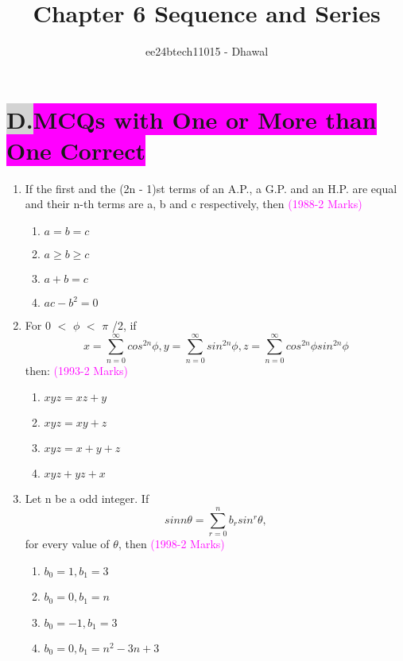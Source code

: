 \documentclass[journal,12pt,twocolumn]{IEEEtran}
\theoremstyle{remark}
\begin{document}

\vspace{3cm}

\title{Chapter 6 Sequence and Series}
\author{ee24btech11015 - Dhawal}
\maketitle
\newpage
\bigskip

\renewcommand{\thefigure}{\theenumi}
\renewcommand{\thetable}{\theenumi}

\section*{\colorbox{lightgray}{D.}\colorbox{magenta}{MCQs with One or More than One Correct}}
\begin{enumerate}
    \item If the first and the (2n - 1)st terms of an A.P., a G.P. and an H.P. are equal and their n-th terms are a, b and c respectively, then  
    \textcolor{magenta}{(1988-2 Marks)}
\begin{multicols}{2}
\begin{enumerate}
\item $a=b=c$
\item $a \geq b \geq c$
\item $a+b=c$
\item $ac-b^2=0$
\end{enumerate}
\end{multicols}

\item For 0 $<$ $\phi$ $<$ $\pi$ /2, if 
\begin{equation*}
x=\sum_{n=0}^{\infty} cos^{2n} \phi ,
y=\sum_{n=0}^{\infty} sin^{2n} \phi ,
z=\sum_{n=0}^{\infty} cos^{2n} \phi sin^{2n} \phi
\end{equation*}
then: \hfill\textcolor{magenta}{(1993-2 Marks)}
\begin{multicols}{2}
\begin{enumerate}
\item $xyz=xz+y$
\item $xyz=xy+z$
\item $xyz=x+y+z$
\item $xyz+yz+x$
\end{enumerate}
\end{multicols}

\item Let n be a odd integer. If 
\begin{equation*}
sin n\theta= \sum_{r=0}^{n} b_r sin^{r} \theta, 
\end{equation*}
for every value of $\theta$, then
\hfill\textcolor{magenta}{(1998-2 Marks)}
\begin{enumerate}
\item $b_0=1, b_1=3$
\item $b_0=0, b_1=n$
\item $b_0=-1, b_1=3$
\item $b_0=0, b_1=n^2-3n+3$
\end{enumerate}


\end{enumerate}
\end{document}
